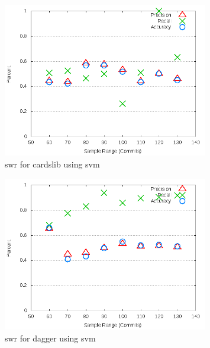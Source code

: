 \begin{figure}[!t]
\centering
\includegraphics[width=0.8\textwidth]{images/svm/test_1/cardslib_sample_range.png}
\caption{\gls{swr} for cardslib using \gls{svm}}
\label{fig:test_1_cardslib_svm}
\end{figure}

\begin{figure}[!t]
\centering
\includegraphics[width=0.8\textwidth]{images/svm/test_1/dagger_sample_range.png}
\caption{\gls{swr} for dagger using \gls{svm}}
\label{fig:test_1_dagger_svm}
\end{figure}

